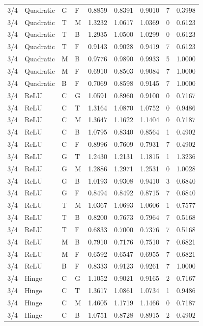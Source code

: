 \begin{longtable}{llllrrrrr}
3/4 & Quadratic & G & F & 0.8859 & 0.8391 & 0.9010 & 7 & 0.3998 \\
3/4 & Quadratic & T & M & 1.3232 & 1.0617 & 1.0369 & 0 & 0.6123 \\
3/4 & Quadratic & T & B & 1.2935 & 1.0500 & 1.0299 & 0 & 0.6123 \\
3/4 & Quadratic & T & F & 0.9143 & 0.9028 & 0.9419 & 7 & 0.6123 \\
3/4 & Quadratic & M & B & 0.9776 & 0.9890 & 0.9933 & 5 & 1.0000 \\
3/4 & Quadratic & M & F & 0.6910 & 0.8503 & 0.9084 & 7 & 1.0000 \\
3/4 & Quadratic & B & F & 0.7069 & 0.8598 & 0.9145 & 7 & 1.0000 \\
3/4 & ReLU & C & G & 1.0591 & 0.8960 & 0.9100 & 0 & 0.7167 \\
3/4 & ReLU & C & T & 1.3164 & 1.0870 & 1.0752 & 0 & 0.9486 \\
3/4 & ReLU & C & M & 1.3647 & 1.1622 & 1.1404 & 0 & 0.7187 \\
3/4 & ReLU & C & B & 1.0795 & 0.8340 & 0.8564 & 1 & 0.4902 \\
3/4 & ReLU & C & F & 0.8996 & 0.7609 & 0.7931 & 7 & 0.4902 \\
3/4 & ReLU & G & T & 1.2430 & 1.2131 & 1.1815 & 1 & 1.3236 \\
3/4 & ReLU & G & M & 1.2886 & 1.2971 & 1.2531 & 0 & 1.0028 \\
3/4 & ReLU & G & B & 1.0193 & 0.9308 & 0.9410 & 3 & 0.6840 \\
3/4 & ReLU & G & F & 0.8494 & 0.8492 & 0.8715 & 7 & 0.6840 \\
3/4 & ReLU & T & M & 1.0367 & 1.0693 & 1.0606 & 1 & 0.7577 \\
3/4 & ReLU & T & B & 0.8200 & 0.7673 & 0.7964 & 7 & 0.5168 \\
3/4 & ReLU & T & F & 0.6833 & 0.7000 & 0.7376 & 7 & 0.5168 \\
3/4 & ReLU & M & B & 0.7910 & 0.7176 & 0.7510 & 7 & 0.6821 \\
3/4 & ReLU & M & F & 0.6592 & 0.6547 & 0.6955 & 7 & 0.6821 \\
3/4 & ReLU & B & F & 0.8333 & 0.9123 & 0.9261 & 7 & 1.0000 \\
3/4 & Hinge & C & G & 1.1052 & 0.9021 & 0.9165 & 2 & 0.7167 \\
3/4 & Hinge & C & T & 1.3617 & 1.0861 & 1.0734 & 1 & 0.9486 \\
3/4 & Hinge & C & M & 1.4605 & 1.1719 & 1.1466 & 0 & 0.7187 \\
3/4 & Hinge & C & B & 1.0751 & 0.8728 & 0.8915 & 2 & 0.4902 \\

\end{longtable}
